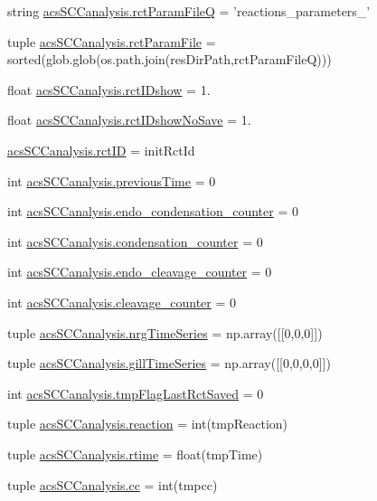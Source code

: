 \begin{DoxyCompactItemize}
string \hyperlink{a00096_aff5ea475bb2c78122a231a915dc88e89}{acs\-S\-C\-Canalysis.\-rct\-Param\-File\-Q} = 'reactions\-\_\-parameters\-\_\-'
\item 
tuple \hyperlink{a00096_ac700504fc38d7684ec9fae104d7d90a3}{acs\-S\-C\-Canalysis.\-rct\-Param\-File} = sorted(glob.\-glob(os.\-path.\-join(res\-Dir\-Path,rct\-Param\-File\-Q)))
\item 
float \hyperlink{a00096_a8a780c7762bc8a40f296abfd474b7ce4}{acs\-S\-C\-Canalysis.\-rct\-I\-Dshow} = 1.
\item 
float \hyperlink{a00096_a3942b0b71d5893c244f7f49929db336b}{acs\-S\-C\-Canalysis.\-rct\-I\-Dshow\-No\-Save} = 1.
\item 
\hyperlink{a00096_a78ffc7d3b69c53ec5389a151e7fdcb83}{acs\-S\-C\-Canalysis.\-rct\-I\-D} = init\-Rct\-Id
\item 
int \hyperlink{a00096_aff96a31e98ac46cb47a67b74f5d87351}{acs\-S\-C\-Canalysis.\-previous\-Time} = 0
\item 
int \hyperlink{a00096_a20a51ec68106a5a97fb3a72f417ca4e6}{acs\-S\-C\-Canalysis.\-endo\-\_\-condensation\-\_\-counter} = 0
\item 
int \hyperlink{a00096_a144441bdbe6e835849cf165ea2946848}{acs\-S\-C\-Canalysis.\-condensation\-\_\-counter} = 0
\item 
int \hyperlink{a00096_af5702a39b502da88dde8c38417a0efbd}{acs\-S\-C\-Canalysis.\-endo\-\_\-cleavage\-\_\-counter} = 0
\item 
int \hyperlink{a00096_a0dd6730b063ac11ae4620c4a0778f6d9}{acs\-S\-C\-Canalysis.\-cleavage\-\_\-counter} = 0
\item 
tuple \hyperlink{a00096_ad4d4abc783f2f7f8d1084b1144b4fe2f}{acs\-S\-C\-Canalysis.\-nrg\-Time\-Series} = np.\-array(\mbox{[}\mbox{[}0,0,0\mbox{]}\mbox{]})
\item 
tuple \hyperlink{a00096_a99669fe823cebc560b46c3746f9183e7}{acs\-S\-C\-Canalysis.\-gill\-Time\-Series} = np.\-array(\mbox{[}\mbox{[}0,0,0,0\mbox{]}\mbox{]})
\item 
int \hyperlink{a00096_a6e8aff976901d1424dd1ff00c3387014}{acs\-S\-C\-Canalysis.\-tmp\-Flag\-Last\-Rct\-Saved} = 0
\item 
tuple \hyperlink{a00096_a58c3618ec28f27dfbf09e0d3aba05bc7}{acs\-S\-C\-Canalysis.\-reaction} = int(tmp\-Reaction)
\item 
tuple \hyperlink{a00096_a162a08b0497058c76e7e885c03a01336}{acs\-S\-C\-Canalysis.\-rtime} = float(tmp\-Time)
\item 
tuple \hyperlink{a00096_a67fcb77a15f51e94c98bb48b05865715}{acs\-S\-C\-Canalysis.\-cc} = int(tmpcc)

\end{DoxyCompactItemize}
